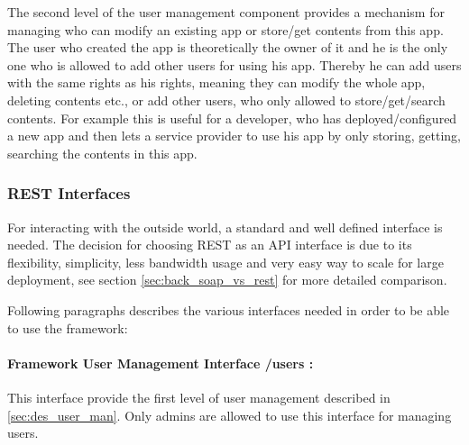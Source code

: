 The second level of the user management component provides a mechanism for managing who can modify an existing app or store/get contents from this app. The user who created the app is theoretically the owner of it and he is the only one who is allowed to add other users for using his app. Thereby he can add users with the same rights as his rights, meaning they can modify the whole app, deleting contents etc., or add other users, who only allowed to store/get/search contents. For example this is useful for a developer, who has deployed/configured a new app and then lets a service provider to use his app by only storing, getting, searching the contents in this app. 

\subsubsection{REST Interfaces \label{sec:des_rest_api}} For interacting with the outside world, a standard and well defined interface is needed. The decision for choosing \ac{REST} as an \ac{API} interface is due to its flexibility, simplicity, less bandwidth usage and very easy way to scale for large deployment, see section \ref{sec:back_soap_vs_rest} for more detailed comparison.

Following paragraphs describes the various interfaces needed in order to be able to use the framework:

\paragraph{Framework User Management Interface /users :} This interface provide the first level of user management described in \ref{sec:des_user_man}. Only admins are allowed to use this interface for managing users.

